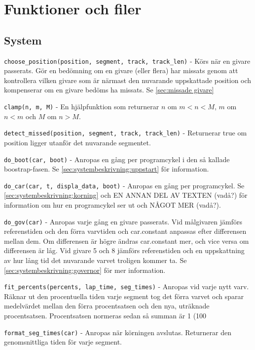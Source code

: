 \section{Funktioner och filer}

\subsection{System}
\label{app:funktioner och filer:system}

\texttt{choose\_position(position, segment, track, track\_len)} - Körs när en
givare passerats. Gör en bedömning om en givare (eller flera) har missats genom
att kontrollera vilken givare som är närmast den nuvarande uppskattade position
och kompenserar om en givare bedöms ha missats. Se \ref{sec:missade givare}

\texttt{clamp(n, m, M)} - En hjälpfunktion som returnerar $n$ om $m < n < M$,
$m$ om $n < m$ och $M$ om $n > M$.

\texttt{detect\_missed(position, segment, track, track\_len)} - Returnerar true
om position ligger utanför det nuvarande segmentet.

\texttt{do\_boot(car, boot)} - Anropas en gång per programcykel i den så kallade
boostrap-fasen. Se \ref{sec:systembeskrivning:uppstart} för information.

\texttt{do\_car(car, t, displa\_data, boot)} - Anropas en gång per programcykel.
Se \ref{sec:systembeskrivning:korning} och EN ANNAN DEL AV TEXTEN (vadå?) för
information om hur en programcykel ser ut och NÅGOT MER (vadå?).

\texttt{do\_gov(car)} - Anropas varje gång en givare passerats. Vid målgivaren
jämförs referenstiden och den förra varvtiden och car.constant anpassas efter
differensen mellan dem. Om differensen är högre ändras car.constant mer, och
vice versa om differensen är låg. Vid givare 5 och 8 jämförs referenstiden och
en uppskattning av hur lång tid det nuvarande varvet troligen kommer ta. Se
\ref{sec:systembeskrivning:governor} för mer information.

\texttt{fit\_percents(percents, lap\_time, seg\_times)} - Anropas vid varje nytt
varv. Räknar ut den procentuella tiden varje segment tog det förra varvet och
sparar medelvärdet mellan den förra procentsatsen och den nya, uträknade
procentsatsen. Procentsatsen normeras sedan så summan är 1 (100%

\texttt{format\_seg\_times(car)} - Anropas när körningen avslutas. Returnerar
den genomsnittliga tiden för varje segment.

